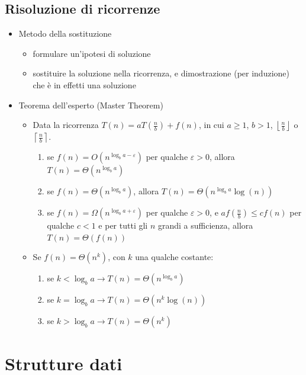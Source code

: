 \documentclass[10pt,a4paper]{article}
\begin{document}
\subsection*{Risoluzione di ricorrenze}
\begin{itemize}
    \item Metodo della sostituzione \begin{itemize}
        \item formulare un'ipotesi di soluzione
        \item sostituire la soluzione nella ricorrenza, e dimostrazione (per induzione) che \`e in effetti una soluzione
    \end{itemize}
    \item Teorema dell'esperto (Master Theorem) \begin{itemize}
        \item Data la ricorrenza $T(n) = aT(\frac{n}{b}) + f(n)$, in cui $a\ge1$, $b>1$, $\left\lfloor\frac{n}{b}\right\rfloor$ o $\left\lceil\frac{n}{b}\right\rceil$.
        \begin{enumerate}
            \item se $f(n) = O\left(n^{\log_ba-\varepsilon}\right)$ per qualche $\varepsilon>0$, allora $T(n)=\varTheta\left(n^{\log_ba}\right)$
            \item se $f(n) = \varTheta\left(n^{\log_ba}\right)$, allora $T(n)=\varTheta\left(n^{\log_ba}\log(n)\right)$
            \item se $f(n) = \varOmega\left(n^{\log_ba+\varepsilon}\right)$ per qualche $\varepsilon>0$, e $af\left(\frac{n}{b}\right)\le cf(n)$ per qualche $c<1$ e per tutti gli $n$ grandi a sufficienza, allora $T(n)=\varTheta(f(n))$
        \end{enumerate}
        \item Se $f(n) = \varTheta\left(n^k\right)$, con $k$ una qualche costante:
        \begin{enumerate}
            \item se $k < \log_ba \rightarrow T(n) = \varTheta\left(n^{\log_ba}\right)$
            \item se $k = \log_ba \rightarrow T(n) = \varTheta\left(n^k\log(n)\right)$
            \item se $k > \log_ba \rightarrow T(n) = \varTheta\left(n^k\right)$
        \end{enumerate}
    \end{itemize}
\end{itemize}

\section*{Strutture dati}
\end{document}

